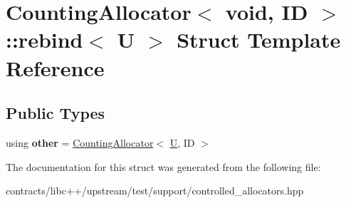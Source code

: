 \hypertarget{struct_counting_allocator_3_01void_00_01_i_d_01_4_1_1rebind}{}\section{Counting\+Allocator$<$ void, ID $>$\+:\+:rebind$<$ U $>$ Struct Template Reference}
\label{struct_counting_allocator_3_01void_00_01_i_d_01_4_1_1rebind}
\subsection*{Public Types}
\begin{DoxyCompactItemize}
\item 
\mbox{\label{struct_counting_allocator_3_01void_00_01_i_d_01_4_1_1rebind_ad2f10ca8d0389fc7f227a560be38cbd6}} 
using {\bfseries other} = \mbox{\hyperlink{class_counting_allocator}{Counting\+Allocator}}$<$ \mbox{\hyperlink{union_u}{U}}, ID $>$
\end{DoxyCompactItemize}


The documentation for this struct was generated from the following file\+:\begin{DoxyCompactItemize}
\item 
contracts/libc++/upstream/test/support/controlled\+\_\+allocators.\+hpp\end{DoxyCompactItemize}
